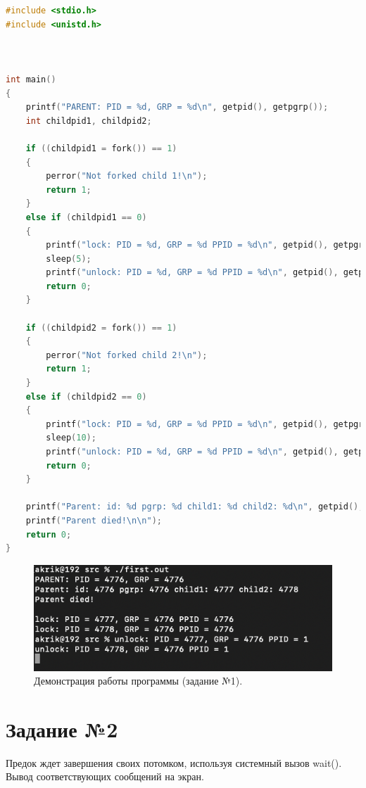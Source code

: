 \documentclass[12pt]{report}
\begin{document}
\begin{lstlisting}[label=some-code,caption=Процессы-сироты,language=C]
#include <stdio.h>
#include <unistd.h>



int main()
{
	printf("PARENT: PID = %d, GRP = %d\n", getpid(), getpgrp());
	int childpid1, childpid2;

	if ((childpid1 = fork()) == 1)
	{
		perror("Not forked child 1!\n");
		return 1;
	} 
	else if (childpid1 == 0) 
	{
		printf("lock: PID = %d, GRP = %d PPID = %d\n", getpid(), getpgrp(), getppid());
		sleep(5);
		printf("unlock: PID = %d, GRP = %d PPID = %d\n", getpid(), getpgrp(), getppid());
		return 0;
	}

	if ((childpid2 = fork()) == 1)
	{
		perror("Not forked child 2!\n");
		return 1;
	} 
	else if (childpid2 == 0) 
	{
		printf("lock: PID = %d, GRP = %d PPID = %d\n", getpid(), getpgrp(), getppid());
		sleep(10);
		printf("unlock: PID = %d, GRP = %d PPID = %d\n", getpid(), getpgrp(), getppid());
		return 0;
	}

	printf("Parent: id: %d pgrp: %d child1: %d child2: %d\n", getpid(), getpgrp(), childpid1, childpid2);
	printf("Parent died!\n\n");
	return 0;
}
\end{lstlisting}

\begin{figure}[H]

	\centering

	\includegraphics[width=\linewidth]{img/first.png}
	\caption{Демонстрация работы программы (задание №1).}

	\label{fig:task01}

\end{figure}

\section*{Задание №2}

Предок ждет завершения своих потомком, используя системный вызов
wait(). Вывод соответствующих сообщений на экран.
\end{document}
